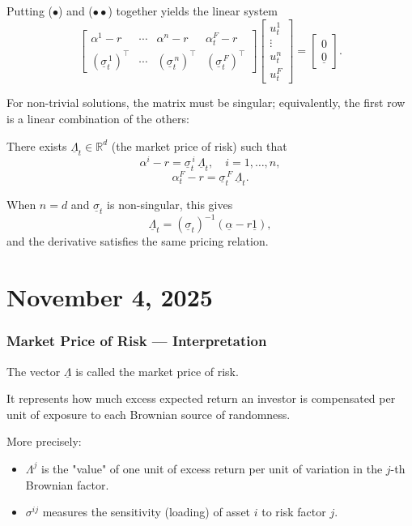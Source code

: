 \documentclass[12pt,a4paper]{article}
\theoremstyle{definition}
\newcommand{\R}{\mathbb{R}}
\begin{document}
Putting ($\bullet$) and ($\bullet\bullet$) together yields the linear system
\[
\begin{bmatrix}
\alpha^1 - r & \cdots & \alpha^n - r & \alpha_t^F - r \\
(\underline{\sigma}_t^{\,1})^\top & \cdots & (\underline{\sigma}_t^{\,n})^\top & (\underline{\sigma}_t^{\,F})^\top
\end{bmatrix}
\begin{bmatrix}
u_t^1 \\
\vdots \\
u_t^n \\
u_t^F
\end{bmatrix}
=
\begin{bmatrix}
0 \\
\underline{0}
\end{bmatrix}.
\]

For non-trivial solutions, the matrix must be singular; equivalently, the first row is a linear combination of the others:

There exists $\underline{\Lambda}_t \in \R^d$ (the market price of risk) such that
\[
\alpha^i - r = \underline{\sigma}_t^{\,i} \, \underline{\Lambda}_t, \quad i = 1, \ldots, n,
\]
\[
\alpha_t^F - r = \underline{\sigma}_t^{\,F} \, \underline{\Lambda}_t.
\]

When $n = d$ and $\underline{\sigma}_t$ is non-singular, this gives
\[
\underline{\Lambda}_t = (\underline{\sigma}_t)^{-1} (\underline{\alpha} - r\underline{1}),
\]
and the derivative satisfies the same pricing relation.

\newpage
\section{November 4, 2025}

\subsubsection{Market Price of Risk — Interpretation}

The vector $\underline{\Lambda}$ is called the market price of risk.

It represents how much excess expected return an investor is compensated per unit of exposure to each Brownian source of randomness.

More precisely:
\begin{itemize}
\item $\Lambda^j$ is the "value" of one unit of excess return per unit of variation in the $j$-th Brownian factor.
\item $\sigma^{ij}$ measures the sensitivity (loading) of asset $i$ to risk factor $j$.
\end{itemize}
\end{document}
